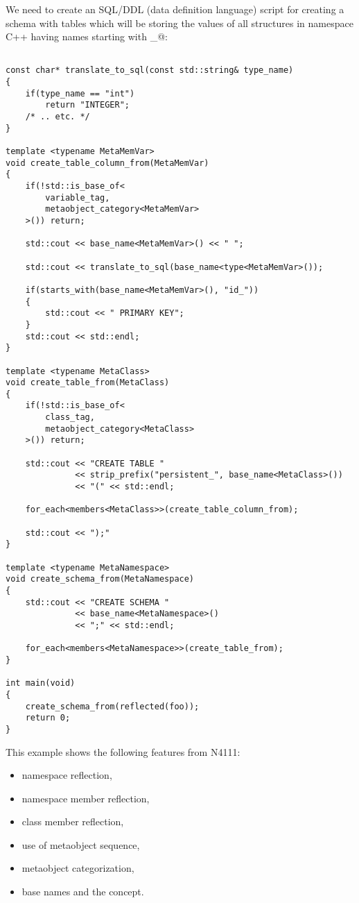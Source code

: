 We need to create an SQL/DDL (data definition language) script for creating a schema
with tables which will be storing the values of all structures in namespace C++ \verb@foo@
having names starting with \verb@persistent_@:

\begin{verbatim}

const char* translate_to_sql(const std::string& type_name)
{
	if(type_name == "int")
		return "INTEGER";
	/* .. etc. */
}

template <typename MetaMemVar>
void create_table_column_from(MetaMemVar)
{
	if(!std::is_base_of<
		variable_tag,
		metaobject_category<MetaMemVar>
	>()) return;

	std::cout << base_name<MetaMemVar>() << " ";

	std::cout << translate_to_sql(base_name<type<MetaMemVar>());

	if(starts_with(base_name<MetaMemVar>(), "id_"))
	{
		std::cout << " PRIMARY KEY";
	}
	std::cout << std::endl;
}

template <typename MetaClass>
void create_table_from(MetaClass)
{
	if(!std::is_base_of<
		class_tag,
		metaobject_category<MetaClass>
	>()) return;

	std::cout << "CREATE TABLE "
	          << strip_prefix("persistent_", base_name<MetaClass>())
	          << "(" << std::endl;

	for_each<members<MetaClass>>(create_table_column_from);

	std::cout << ");"
}

template <typename MetaNamespace>
void create_schema_from(MetaNamespace)
{
	std::cout << "CREATE SCHEMA "
	          << base_name<MetaNamespace>()
	          << ";" << std::endl;

	for_each<members<MetaNamespace>>(create_table_from);
}

int main(void)
{
	create_schema_from(reflected(foo));
	return 0;
}

\end{verbatim}

This example shows the following features from N4111:

\begin{itemize}
\item{namespace reflection,}
\item{namespace member reflection,}
\item{class member reflection,}
\item{use of metaobject sequence,}
\item{metaobject categorization,}
\item{base names and the  concept.}
\end{itemize}

